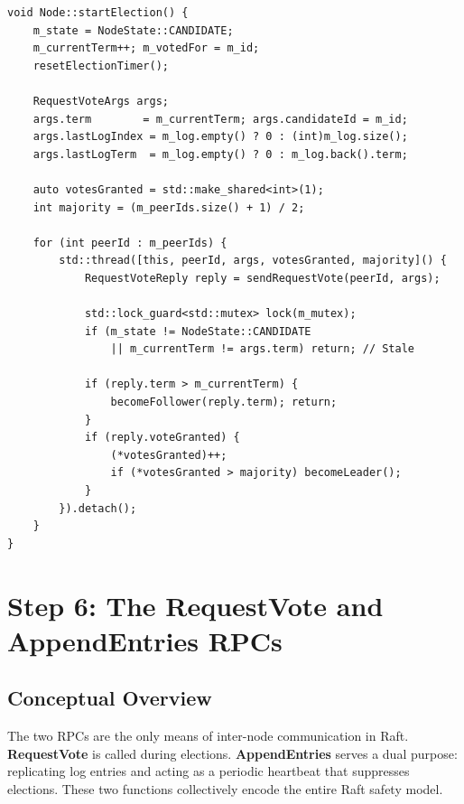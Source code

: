 \documentclass[11pt, a4paper]{article}
\begin{document}
\begin{lstlisting}[style=cppstyle, caption={Node.cpp --- startElection()}]
void Node::startElection() {
    m_state = NodeState::CANDIDATE;
    m_currentTerm++; m_votedFor = m_id;
    resetElectionTimer();

    RequestVoteArgs args;
    args.term        = m_currentTerm; args.candidateId = m_id;
    args.lastLogIndex = m_log.empty() ? 0 : (int)m_log.size();
    args.lastLogTerm  = m_log.empty() ? 0 : m_log.back().term;

    auto votesGranted = std::make_shared<int>(1);
    int majority = (m_peerIds.size() + 1) / 2;

    for (int peerId : m_peerIds) {
        std::thread([this, peerId, args, votesGranted, majority]() {
            RequestVoteReply reply = sendRequestVote(peerId, args);

            std::lock_guard<std::mutex> lock(m_mutex);
            if (m_state != NodeState::CANDIDATE
                || m_currentTerm != args.term) return; // Stale

            if (reply.term > m_currentTerm) {
                becomeFollower(reply.term); return;
            }
            if (reply.voteGranted) {
                (*votesGranted)++;
                if (*votesGranted > majority) becomeLeader();
            }
        }).detach();
    }
}
\end{lstlisting}

\newpage

\section{Step 6: The RequestVote and AppendEntries RPCs}

\subsection{Conceptual Overview}
The two RPCs are the only means of inter-node communication in Raft.
\textbf{RequestVote} is called during elections. \textbf{AppendEntries}
serves a dual purpose: replicating log entries and acting as a periodic
heartbeat that suppresses elections. These two functions collectively encode
the entire Raft safety model.
\end{document}
